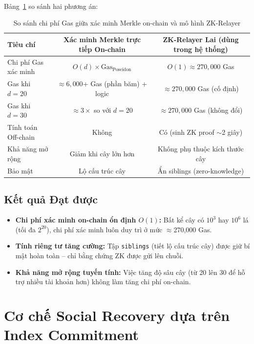 \documentclass[../DoAn.tex]{subfiles}
\begin{document}
Bảng~\ref{table:merkle_gas_compare} so sánh hai phương án:

\begin{table}[H]
\centering
\begin{tabular}{|l|c|c|}
\hline
\textbf{Tiêu chí} & \textbf{Xác minh Merkle trực tiếp On-chain} & \textbf{ZK-Relayer Lai (dùng trong hệ thống)} \\ \hline
Chi phí Gas xác minh & $O(d) \times \text{Gas}_\text{Poseidon}$ & $O(1) \approx 270{,}000$ Gas \\ \hline
Gas khi $d=20$ & $\approx 6{,}000$+ Gas (phần băm) + logic & $\approx 270{,}000$ Gas (cố định) \\ \hline
Gas khi $d=30$ & $\approx 3\times$ so với $d=20$ & $\approx 270{,}000$ Gas (không đổi) \\ \hline
Tính toán Off-chain & Không & Có (sinh ZK proof $\sim$2 giây) \\ \hline
Khả năng mở rộng & Giảm khi cây lớn hơn & Không phụ thuộc kích thước cây \\ \hline
Bảo mật & Lộ cấu trúc cây & Ẩn siblings (zero-knowledge) \\ \hline
\end{tabular}
\caption{So sánh chi phí Gas giữa xác minh Merkle on-chain và mô hình ZK-Relayer}
\label{table:merkle_gas_compare}
\end{table}

\subsection{Kết quả Đạt được}
\label{subsec:merkle_result}

\begin{itemize}
    \item \textbf{Chi phí xác minh on-chain ổn định $O(1)$:} Bất kể cây có $10^3$ hay $10^6$ lá (tối đa $2^{20}$), chi phí xác minh luôn duy trì ở mức $\approx$270,000 Gas.
    \item \textbf{Tính riêng tư tăng cường:} Tập \texttt{siblings} (tiết lộ cấu trúc cây) được giữ bí mật hoàn toàn -- chỉ bằng chứng ZK được gửi lên chuỗi.
    \item \textbf{Khả năng mở rộng tuyến tính:} Việc tăng độ sâu cây (từ 20 lên 30 để hỗ trợ nhiều tài khoản hơn) không làm tăng chi phí on-chain.
\end{itemize}

\section{Cơ chế Social Recovery dựa trên Index Commitment}
\label{sec:social_recovery_contrib}
\end{document}
